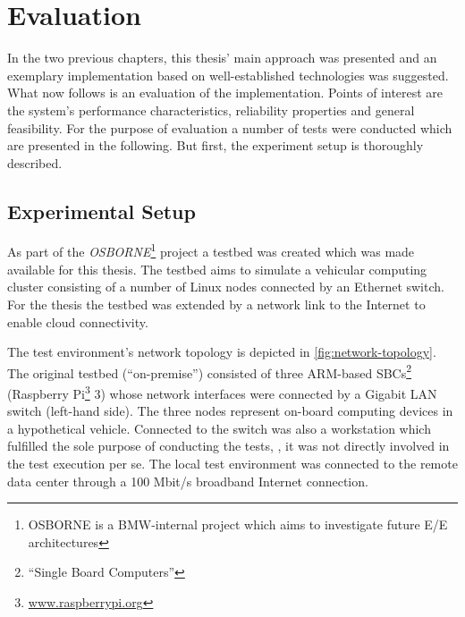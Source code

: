 \chapter{Evaluation}\label{chapter:evaluation}
In the two previous chapters, this thesis' main approach was presented and an exemplary implementation based on well-established technologies was suggested. What now follows is an evaluation of the implementation. Points of interest are the system's performance characteristics, reliability properties and general feasibility. For the purpose of evaluation a number of tests were conducted which are presented in the following. But first, the experiment setup is thoroughly described.


\section{Experimental Setup}\label{sec:testsetup}

As part of the \emph{OSBORNE}\footnote{OSBORNE is a BMW-internal project which aims to investigate future E/E architectures} project a testbed was created which was made available for this thesis. The testbed aims to simulate a vehicular computing cluster consisting of a number of Linux nodes connected by an Ethernet switch. For the thesis the testbed was extended by a network link to the Internet to enable cloud connectivity. 

The test environment's network topology is depicted in \autoref{fig:network-topology}. The original testbed (``on-premise'') consisted of three ARM-based SBCs\footnote{``Single Board Computers''} (Raspberry Pi\footnote{\url{www.raspberrypi.org}} 3) whose network interfaces were connected by a Gigabit LAN switch (left-hand side). The three nodes represent on-board computing devices in a hypothetical vehicle. Connected to the switch was also a workstation which fulfilled the sole purpose of conducting the tests, \ie , it was not directly involved in the test execution per se. The local test environment was connected to the remote data center through a 100 Mbit/s broadband Internet connection.

